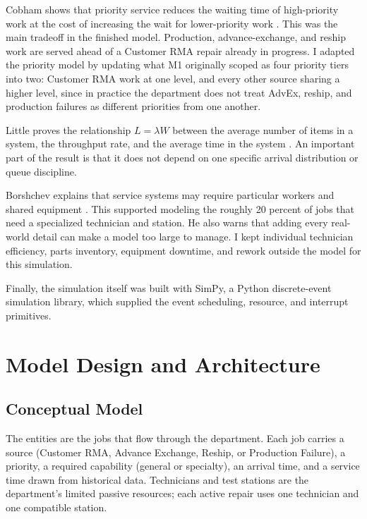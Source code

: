 \documentclass[12pt, letterpaper, twoside]{article}
\begin{document}
Cobham shows that priority service reduces the waiting time of high-priority work at the
cost of increasing the wait for lower-priority work \cite{cobham1954}. This was the main
tradeoff in the finished model. Production, advance-exchange, and reship work are served
ahead of a Customer RMA repair already in progress. I adapted the priority model by
updating what M1 originally scoped as four priority tiers into two: Customer RMA
work at one level, and every other source sharing a higher level, since in practice the
department does not treat AdvEx, reship, and production failures as different priorities
from one another.

Little proves the relationship $L = \lambda W$ between the average number of items in a
system, the throughput rate, and the average time in the system \cite{little1961}. An
important part of the result is that it does not depend on one specific arrival
distribution or queue discipline. 

Borshchev explains that service systems may require particular workers and shared
equipment \cite{borshchev2020}. This supported modeling the roughly 20 percent of jobs
that need a specialized technician and station. He also warns that adding every
real-world detail can make a model too large to manage. I kept individual technician
efficiency, parts inventory, equipment downtime, and rework outside the model for this simulation.

Finally, the simulation itself was built with SimPy, a Python discrete-event simulation
library, which supplied the event scheduling, resource, and interrupt primitives.

\section{Model Design and Architecture}

\subsection{Conceptual Model}

The entities are the jobs that flow through the department. Each job carries a source
(Customer RMA, Advance Exchange, Reship, or Production Failure), a priority, a required
capability (general or specialty), an arrival time, and a service time drawn from
historical data. Technicians and test stations are the department's limited passive
resources; each active repair uses one technician and one compatible station.
\end{document}
